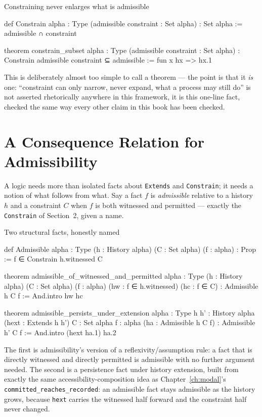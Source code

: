 \begin{experiment}{Constraining never enlarges what is admissible}
\begin{lean}
def Constrain {alpha : Type} (admissible constraint : Set alpha) : Set alpha :=
  admissible ∩ constraint

theorem constrain_subset {alpha : Type}
    (admissible constraint : Set alpha) :
    Constrain admissible constraint ⊆ admissible := fun x hx => hx.1
\end{lean}
This is deliberately almost too simple to call a theorem — the
point is that it \emph{is} one: ``constraint can only narrow, never
expand, what a process may still do'' is not asserted rhetorically
anywhere in this framework, it is this one-line fact, checked the
same way every other claim in this book has been checked.
\end{experiment}

\section{A Consequence Relation for Admissibility}

A logic needs more than isolated facts about \texttt{Extends} and
\texttt{Constrain}; it needs a notion of what follows from what. Say
a fact $f$ is \emph{admissible} relative to a history $h$ and a
constraint $C$ when $f$ is both witnessed and permitted — exactly
the \texttt{Constrain} of Section~2, given a name.

\begin{experiment}{Two structural facts, honestly named}
\begin{lean}
def Admissible {alpha : Type} (h : History alpha) (C : Set alpha)
    (f : alpha) : Prop := f ∈ Constrain h.witnessed C

theorem admissible_of_witnessed_and_permitted {alpha : Type}
    (h : History alpha) (C : Set alpha) (f : alpha)
    (hw : f ∈ h.witnessed) (hc : f ∈ C) : Admissible h C f :=
  And.intro hw hc

theorem admissible_persists_under_extension {alpha : Type}
    {h h' : History alpha} (hext : Extends h h')
    {C : Set alpha} {f : alpha} (ha : Admissible h C f) :
    Admissible h' C f :=
  And.intro (hext ha.1) ha.2
\end{lean}
The first is admissibility's version of a reflexivity/assumption
rule: a fact that is directly witnessed and directly permitted is
admissible with no further argument needed. The second is a
persistence fact under history extension, built from exactly the
same accessibility-composition idea as
Chapter~\ref{ch:modal}'s \texttt{committed\_reaches\_recorded}: an
admissible fact stays admissible as the history grows, because
\texttt{hext} carries the witnessed half forward and the constraint
half never changed.
\end{experiment}

